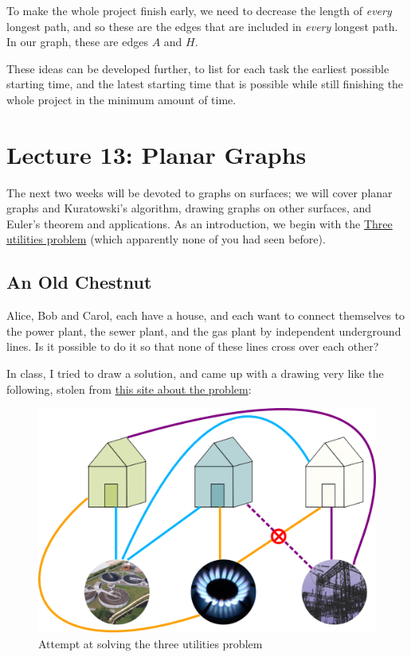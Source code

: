 \documentclass[]{article}
\begin{document}
To make the whole project finish early, we need to decrease the length
of \emph{every} longest path, and so these are the edges that are
included in \emph{every} longest path. In our graph, these are edges
\(A\) and \(H\).

These ideas can be developed further, to list for each task the earliest
possible starting time, and the latest starting time that is possible
while still finishing the whole project in the minimum amount of time.

\section{Lecture 13: Planar Graphs}

The next two weeks will be devoted to graphs on surfaces; we will cover
planar graphs and Kuratowski's algorithm, drawing graphs on other
surfaces, and Euler's theorem and applications. As an introduction, we
begin with the
\href{https://en.wikipedia.org/wiki/Three_utilities_problem}{Three
utilities problem} (which apparently none of you had seen before).

\subsection{An Old Chestnut}\label{an-old-chestnut}

Alice, Bob and Carol, each have a house, and each want to connect
themselves to the power plant, the sewer plant, and the gas plant by
independent underground lines. Is it possible to do it so that none of
these lines cross over each other?

In class, I tried to draw a solution, and came up with a drawing very
like the following, stolen from
\href{http://www.science4all.org/article/eulers-formula-and-the-utilities-problem/}{this
site about the problem}:

\begin{figure}[htbp]
\centering
\includegraphics{The-Utilities-Problem-Bad-Solution.png}
\caption{Attempt at solving the three utilities problem}
\end{figure}
\end{document}
